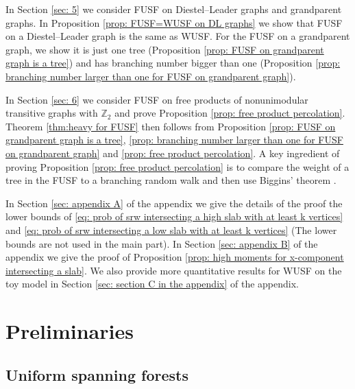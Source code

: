 \documentclass[12pt]{article}
\numberwithin{equation}{section}
\newcommand{\1}{\mathbf{1}}
\begin{document}
  In Section \ref{sec: 5} we consider FUSF on  Diestel--Leader graphs and grandparent graphs. In Proposition \ref{prop: FUSF=WUSF on DL graphs} we show that FUSF on  a Diestel--Leader graph is the same as WUSF. For the FUSF on a grandparent graph, we show it is just one tree (Proposition \ref{prop: FUSF on grandparent graph is a tree}) and has branching number bigger than one (Proposition \ref{prop: branching number larger than one for FUSF on grandparent graph}).  
  
   
  In Section \ref{sec: 6} we consider FUSF on free products of  nonunimodular transitive graphs with  $\mathbb{Z}_2$ and prove Proposition \ref{prop: free product percolation}. Theorem \ref{thm:heavy for FUSF} then follows from  Proposition \ref{prop: FUSF on grandparent graph is a tree}, \ref{prop: branching number larger than one for FUSF on grandparent graph} and \ref{prop: free product percolation}. A key ingredient of proving Proposition \ref{prop: free product percolation} is to compare the weight of a tree in the FUSF to a branching random walk and then use Biggins' theorem \cite{Lyons1997}. 
 
 In Section \ref{sec: appendix A} of the appendix we give the details of the proof the lower bounds of \eqref{eq: prob of srw intersecting a high slab with at least k vertices} and \eqref{eq: prob of srw intersecting a low slab with at least k vertices} (The lower bounds are not used in the main part).  In Section \ref{sec: appendix B} of the appendix we give the proof of Proposition \ref{prop: high moments for x-component intersecting a slab}. We also provide more quantitative results for WUSF on the toy model in Section \ref{sec: section C in the appendix} of the appendix. 
 
 
 
 
 
 
 
 
 
 
 
 
 
 
 
 
 
 
 
 
 \section{Preliminaries}\label{sec: 2}
 
 \subsection{Uniform spanning forests}
 
\end{document}
